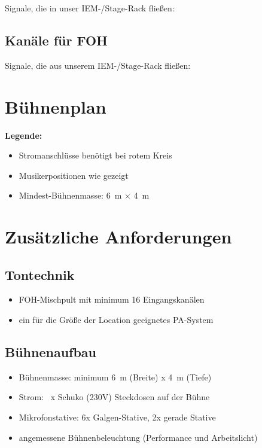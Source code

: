 \documentclass[standard]{techrider}  %
\begin{document}
Signale, die in unser IEM-/Stage-Rack fließen:


\subsection{Kanäle für FOH}

Signale, die aus unserem IEM-/Stage-Rack fließen:

\outputChannelsTable


\section{Bühnenplan}

\drawStagePlot

\textbf{Legende:}
\begin{itemize}
    \item Stromanschlüsse benötigt bei rotem Kreis
    \item Musikerpositionen wie gezeigt  
    \item Mindest-Bühnenmasse: 6 m × 4 m
\end{itemize}


\section{Zusätzliche Anforderungen}

\subsection{Tontechnik}
\begin{itemize}
    \item FOH-Mischpult mit minimum 16 Eingangskanälen
    \item ein für die Größe der Location geeignetes PA-System
\end{itemize}

\subsection{Bühnenaufbau}
\begin{itemize}
    \item Bühnenmasse: minimum 6 m (Breite) x 4 m (Tiefe)
    \item Strom: \totalPowerNeeded\ x Schuko (230V) Steckdosen auf der Bühne
    \item Mikrofonstative: 6x Galgen-Stative, 2x gerade Stative
    \item angemessene Bühnenbeleuchtung (Performance und Arbeitslicht)
\end{itemize}
\end{document}
